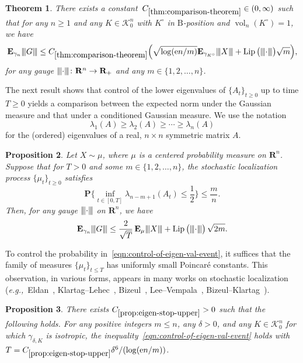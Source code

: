 \documentclass[11pt]{amsart}
\newcommand{\R}{\mathbf R}
\newcommand{\E}{\mathbf E}
\newcommand{\Prob}{\mathbf P}
\newcommand{\Vol}{\operatorname{vol}}
\newcommand{\Lip}{\operatorname{Lip}}
\newcommand{\1}{\mathbf 1}
\newcommand{\vertiii}[1]{{\left\vert\kern-0.25ex\left\vert\kern-0.25ex\left\vert #1 
\right\vert\kern-0.25ex\right\vert\kern-0.25ex\right\vert}}
\newcommand{\gauge}[1]{\vertiii{#1}}
\newcommand{\e}{\mathrm{e}}
\newcommand{\eg}{\emph{e.g.,}}
\newcommand{\Bodies}{\mathcal{K}_0^n}
\newcommand{\Bobkov}{\mathrm{B}}
\let\vol\Vol
\theoremstyle{plain}
\newtheorem{theorem}{Theorem}[section]
\newtheorem{proposition}[theorem]{Proposition}
\begin{document}
\begin{theorem}
\label{thm:comparison-theorem}
There exists a constant~$C_{\ref{thm:comparison-theorem}} \in (0, \infty)$ such that for any $n \geq 1$ and any $K \in \Bodies$ with $K^\circ$ in $\Bobkov$-position and $\vol_n(K^\circ) = 1$, we have
\[
\E_{\gamma_n} \gauge{G} \leq C_{\ref{thm:comparison-theorem}}
 \Big(\sqrt{\log(\e n/m)} \E_{\gamma_{K^\circ}} \gauge{X}  + \Lip\big(\gauge{\cdot}\big) \sqrt{m} \Big),
\]
for any gauge $\gauge{\cdot} \colon \R^n \to \R_+$ and any $m \in\{1, 2, \dots, n\}$. 
\end{theorem}


The next result shows that control of the lower eigenvalues of $\{A_t\}_{t \geq 0}$ up to time $T \geq 0$ yields a comparison between the expected norm under the Gaussian measure and that under a conditioned Gaussian measure. We use the notation
\[
\lambda_1(A) \geq \lambda_2(A) \geq \cdots \geq \lambda_n(A)
\]
for the (ordered) eigenvalues of a real, $n \times n$ symmetric matrix $A$. 
\begin{proposition}
\label{prop:from-eigen-control-to-comparison-theorem}
Let $X \sim \mu$, where $\mu$ is a centered probability measure on $\R^n$. Suppose that for $T > 0$ and some $m \in \{1, 2, \dots, n\}$, the stochastic localization process $\{\mu_t\}_{t \geq 0}$ satisfies
    \begin{equation}
    \label{eqn:control-of-eigen-val-event}
    \Prob\bigg\{ \inf_{t \in [0, T]}\lambda_{n-m+1}(A_t) \leq \frac{1}{2} \bigg\} \leq \frac{m}{n}. 
    \end{equation}
    Then, for any gauge $\gauge{\cdot}$ on $\R^n$, we have
    \[
    \E_{\gamma_n} \gauge{G} \leq \frac{2}{\sqrt{T}}\,  \E_\mu \gauge{X} + \Lip\big(\gauge{\cdot}\big)\, \sqrt{2m}.
    \]
\end{proposition}

To control the probability in~\eqref{eqn:control-of-eigen-val-event}, it suffices that the family of measures $\{\mu_t\}_{t \leq T}$ has uniformly small Poincar\'{e} constants. This observation, in various forms, appears in many works on stochastic localization (\eg~Eldan~\cite[Section 3]{Eld13}, Klartag--Lehec~\cite[Lemma~5.2]{KlaLeh22}, Bizeul~\cite[Lemma~3.6]{Biz24}, Lee--Vempala~\cite[Lemma 38]{LeeVem24}, Bizeul--Klartag~\cite[Proposition 2.3]{BizKla26}).

\begin{proposition}
\label{prop:eigen-stop-upper}
There exists $C_{\ref{prop:eigen-stop-upper}} > 0$ 
such that the following holds. 
For any positive integers $m \leq n$,
any $\delta > 0$, and any $K \in \Bodies$ for which $\gamma_{\delta, K}$ is isotropic, the inequality~\eqref{eqn:control-of-eigen-val-event} holds with $T = C_{\ref{prop:eigen-stop-upper}} \delta^6/(\log(\e n/m))$. 
\end{proposition}
\end{document}
